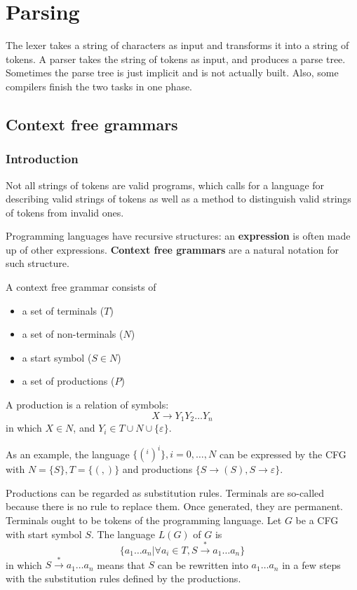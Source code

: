 \ifx\PREAMBLE\undefined


\fi
\chapter{Parsing}
The lexer takes a string of characters as input and transforms it into a string of tokens. A parser takes the string of tokens as input, and produces a parse tree. Sometimes the parse tree is just implicit and is not actually built. Also, some compilers finish the two tasks in one phase.
\section{Context free grammars}
\subsection{Introduction}
Not all strings of tokens are valid programs, which calls for a language for describing valid strings of tokens as well as a method to distinguish valid strings of tokens from invalid ones.

Programming languages have recursive structures: an {\bf expression} is often made up of other expressions. {\bf Context free grammars} are a natural notation for such structure.

A context free grammar consists of 
\begin{itemize}
\item a set of terminals  ($T$)
\item a set of non-terminals ($N$)
\item a start symbol ($S\in N$)
\item a set of productions ($P$)
\end{itemize}

A production is a relation of symbols:
\begin{equation*}
X\rightarrow Y_1Y_2\dots Y_n
\end{equation*}
in which $X\in N$, and $Y_i\in T\cup N\cup \{\varepsilon\}$. 

As an example, the language $\{(^i)^i\} ,i = 0,\dots,N$ can be expressed by the CFG with  $N = \{S\}, T = \{(,)\}$
and productions $\{S\rightarrow (S), S\rightarrow \varepsilon \}$.

Productions can be regarded as substitution rules. Terminals are so-called because there is no rule to replace them. Once generated, they are permanent. Terminals ought to be tokens of the programming language. Let $G$ be a CFG with start symbol $S$. The language $L(G)$ of $G$ is 
\begin{equation*}
\{a_1\dots a_n|\forall a_i\in T, S\xrightarrow{*}a_1\dots a_n\}
\end{equation*}
in which $S\xrightarrow{*}a_1\dots a_n$ means that $S$ can be rewritten into $a_1\dots a_n$ in a few steps with the substitution rules defined by the productions.

